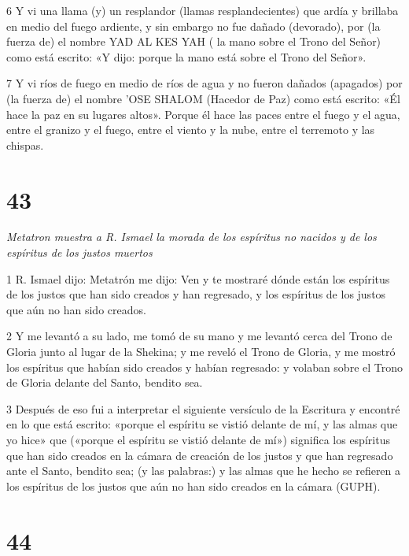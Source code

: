 \par 6 Y vi una llama (y) un resplandor (llamas resplandecientes) que ardía y brillaba en medio del fuego ardiente, y sin embargo no fue dañado (devorado), por (la fuerza de) el nombre YAD AL KES YAH ( la mano sobre el Trono del Señor) como está escrito: «Y dijo: porque la mano está sobre el Trono del Señor».

\par 7 Y vi ríos de fuego en medio de ríos de agua y no fueron dañados (apagados) por (la fuerza de) el nombre 'OSE SHALOM (Hacedor de Paz) como está escrito: «Él hace la paz en su lugares altos». Porque él hace las paces entre el fuego y el agua, entre el granizo y el fuego, entre el viento y la nube, entre el terremoto y las chispas.

\chapter{43}

\par \textit{Metatron muestra a R. Ismael la morada de los espíritus no nacidos y de los espíritus de los justos muertos}

\par 1 R. Ismael dijo: Metatrón me dijo: Ven y te mostraré dónde están los espíritus de los justos que han sido creados y han regresado, y los espíritus de los justos que aún no han sido creados.

\par 2 Y me levantó a su lado, me tomó de su mano y me levantó cerca del Trono de Gloria junto al lugar de la Shekina; y me reveló el Trono de Gloria, y me mostró los espíritus que habían sido creados y habían regresado: y volaban sobre el Trono de Gloria delante del Santo, bendito sea.

\par 3 Después de eso fui a interpretar el siguiente versículo de la Escritura y encontré en lo que está escrito: «porque el espíritu se vistió delante de mí, y las almas que yo hice» que («porque el espíritu se vistió delante de mí») significa los espíritus que han sido creados en la cámara de creación de los justos y que han regresado ante el Santo, bendito sea; (y las palabras:) y las almas que he hecho se refieren a los espíritus de los justos que aún no han sido creados en la cámara (GUPH).


\chapter{44}

